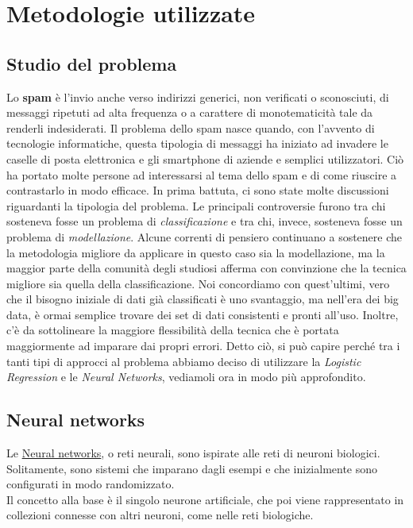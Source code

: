 \section{Metodologie utilizzate}

\subsection{Studio del problema}
Lo \textbf{spam} è l'invio anche verso indirizzi generici, non verificati o sconosciuti, di messaggi ripetuti ad alta frequenza o a carattere di monotematicità tale da renderli indesiderati. Il problema dello spam nasce quando, con l'avvento di tecnologie informatiche, questa tipologia di messaggi ha iniziato ad invadere le caselle di posta elettronica e gli smartphone di aziende e semplici utilizzatori. Ciò ha portato molte persone ad interessarsi al tema dello spam e di come riuscire a contrastarlo in modo efficace.
\newline
In prima battuta, ci sono state molte discussioni riguardanti la tipologia del problema. Le principali controversie furono tra chi sosteneva fosse un problema di \textit{classificazione} e tra chi, invece, sosteneva fosse un problema di \textit{modellazione}.
Alcune correnti di pensiero continuano a sostenere che la metodologia migliore da applicare in questo caso sia la modellazione, ma la maggior parte della comunità degli studiosi afferma con convinzione che la tecnica migliore sia quella della classificazione. Noi concordiamo con quest'ultimi, vero che il bisogno iniziale di dati già classificati è uno svantaggio, ma nell'era dei big data, è ormai semplice trovare dei set di dati consistenti e pronti all'uso. Inoltre, c'è da sottolineare la maggiore flessibilità della tecnica che è portata maggiormente ad imparare dai propri errori.
\newline
Detto ciò, si può capire perché tra i tanti tipi di approcci al problema abbiamo deciso di utilizzare la \textit{Logistic Regression} e le \textit{Neural Networks}, vediamoli ora in modo più approfondito.
\subsection{Neural networks}
Le \href{https://en.wikipedia.org/wiki/Neural_network}{Neural networks}, o reti neurali, sono ispirate alle reti di neuroni biologici. Solitamente, sono sistemi che imparano dagli esempi e che inizialmente sono configurati in modo randomizzato.\\
Il concetto alla base è il singolo neurone artificiale, che poi viene rappresentato in collezioni connesse con altri neuroni, come nelle reti biologiche.

